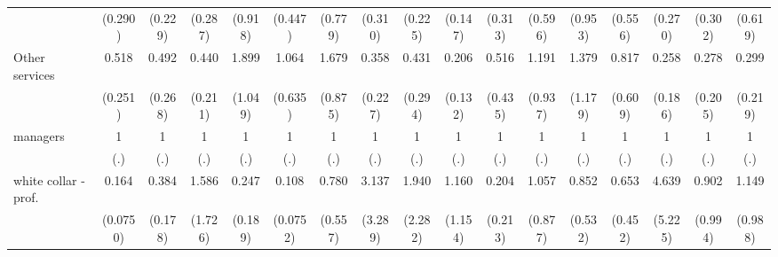 {\begin{tabular}{l*{16}{c}}
                    &     (0.290)         &     (0.229)         &     (0.287)         &     (0.918)         &     (0.447)         &     (0.779)         &     (0.310)         &     (0.225)         &     (0.147)         &     (0.313)         &     (0.596)         &     (0.953)         &     (0.556)         &     (0.270)         &     (0.302)         &     (0.619)         \\
[1em]
Other services      &       0.518         &       0.492         &       0.440         &       1.899         &       1.064         &       1.679         &       0.358         &       0.431         &       0.206\sym{*}  &       0.516         &       1.191         &       1.379         &       0.817         &       0.258         &       0.278         &       0.299         \\
                    &     (0.251)         &     (0.268)         &     (0.211)         &     (1.049)         &     (0.635)         &     (0.875)         &     (0.227)         &     (0.294)         &     (0.132)         &     (0.435)         &     (0.937)         &     (1.179)         &     (0.609)         &     (0.186)         &     (0.205)         &     (0.219)         \\
[1em]
managers            &           1         &           1         &           1         &           1         &           1         &           1         &           1         &           1         &           1         &           1         &           1         &           1         &           1         &           1         &           1         &           1         \\
                    &         (.)         &         (.)         &         (.)         &         (.)         &         (.)         &         (.)         &         (.)         &         (.)         &         (.)         &         (.)         &         (.)         &         (.)         &         (.)         &         (.)         &         (.)         &         (.)         \\
[1em]
white collar - prof.&       0.164\sym{***}&       0.384\sym{*}  &       1.586         &       0.247         &       0.108\sym{**} &       0.780         &       3.137         &       1.940         &       1.160         &       0.204         &       1.057         &       0.852         &       0.653         &       4.639         &       0.902         &       1.149         \\
                    &    (0.0750)         &     (0.178)         &     (1.726)         &     (0.189)         &    (0.0752)         &     (0.557)         &     (3.289)         &     (2.282)         &     (1.154)         &     (0.213)         &     (0.877)         &     (0.532)         &     (0.452)         &     (5.225)         &     (0.994)         &     (0.988)         \\

\end{tabular}}

